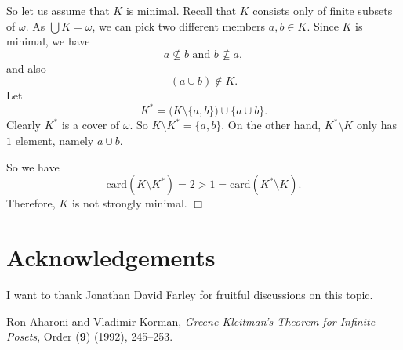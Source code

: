 \documentclass[12pt]{amsart}
\newcommand{\proofend}{{\hfill $\Box$}}
\newcommand{\card}{{\mathrm{card}}}
\begin{document}
So let us assume
that $K$ is minimal. Recall that $K$ consists only of finite
subsets of $\omega$. As $\bigcup K = \omega$, we can pick
two different members $a, b\in K$. Since $K$ is minimal, we have
$$a\not\subseteq b \text{ and } b\not\subseteq a,$$ and also
$$(a\cup b)\notin K.$$
Let $$K^* = \big(K \setminus \{a, b\}\big) \cup \{a \cup b\}.$$
Clearly $K^*$ is a cover of $\omega$. So
$K \setminus K^* = \{a, b\}$.
On the other hand, $K^*\setminus K$ only has $1$ element, namely $a\cup b$. 

So we have $$\card(K\setminus K^*) = 2 > 1 = \card(K^* \setminus K).$$
Therefore, $K$ is not strongly minimal. \proofend
\section{Acknowledgements}
I want to thank Jonathan David Farley for fruitful discussions
on this topic.
{\footnotesize
\begin{thebibliography}{99}
 Ron Aharoni and Vladimir Korman, {\it
Greene-Kleitman's Theorem for Infinite Posets}, Order
({\bf 9}) (1992),  245--253.
\end{thebibliography}
}
\end{document}

